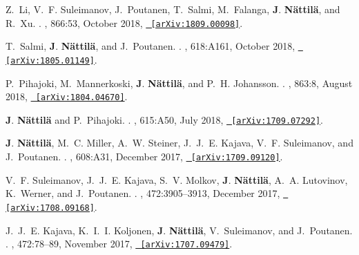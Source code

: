 \documentclass[letterpaper, onecolumn, 11pt]{article}
\begin{document}
\begin{thebibliography}{10}
Z.~{Li}, V.~F. {Suleimanov}, J.~{Poutanen}, T.~{Salmi}, M.~{Falanga},
  \textbf{J}. {\textbf{N{\"a}ttil{\"a}}}, and R.~{Xu}.
.
\newblock {\em \apj}, 866:53, October 2018,
  \href{http://arxiv.org/abs/1809.00098}{\nolinkurl{ [arXiv:1809.00098]}}.

T.~{Salmi}, \textbf{J}. \textbf{{N{\"a}ttil{\"a}}}, and J.~{Poutanen}.
.
\newblock {\em \aap}, 618:A161, October 2018,
  \href{http://arxiv.org/abs/1805.01149}{\nolinkurl{ [arXiv:1805.01149]}}.

P.~{Pihajoki}, M.~{Mannerkoski}, \textbf{J}. \textbf{{N{\"a}ttil{\"a}}}, and
  P.~H. {Johansson}.
.
\newblock {\em \apj}, 863:8, August 2018,
  \href{http://arxiv.org/abs/1804.04670}{\nolinkurl{ [arXiv:1804.04670]}}.

\textbf{J}. \textbf{{N{\"a}ttil{\"a}}} and P.~{Pihajoki}.
.
\newblock {\em \aap}, 615:A50, July 2018,
  \href{http://arxiv.org/abs/1709.07292}{\nolinkurl{ [arXiv:1709.07292]}}.

\textbf{J}. \textbf{{N{\"a}ttil{\"a}}}, M.~C. {Miller}, A.~W. {Steiner},
  J.~J.~E. {Kajava}, V.~F. {Suleimanov}, and J.~{Poutanen}.
.
\newblock {\em \aap}, 608:A31, December 2017,
  \href{http://arxiv.org/abs/1709.09120}{\nolinkurl{ [arXiv:1709.09120]}}.

V.~F. {Suleimanov}, J.~J.~E. {Kajava}, S.~V. {Molkov}, \textbf{J}.
  \textbf{{N{\"a}ttil{\"a}}}, A.~A. {Lutovinov}, K.~{Werner}, and
  J.~{Poutanen}.
.
\newblock {\em \mnras}, 472:3905--3913, December 2017,
  \href{http://arxiv.org/abs/1708.09168}{\nolinkurl{ [arXiv:1708.09168]}}.

J.~J.~E. {Kajava}, K.~I.~I. {Koljonen}, \textbf{J}. \textbf{N{\"a}ttil{\"a}},
  V.~{Suleimanov}, and J.~{Poutanen}.
.
\newblock {\em \mnras}, 472:78--89, November 2017,
  \href{http://arxiv.org/abs/1707.09479}{\nolinkurl{ [arXiv:1707.09479]}}.


\end{thebibliography}
\end{document}
